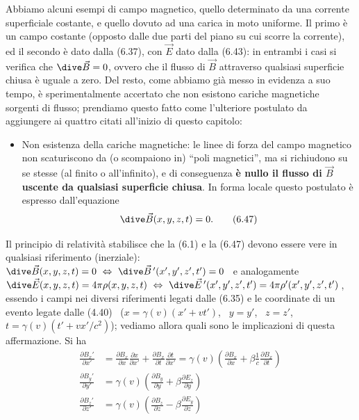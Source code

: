 Abbiamo alcuni esempi di campo magnetico, quello determinato da una corrente
superficiale costante, e quello dovuto ad una carica in moto uniforme. Il primo
\`e un campo costante (opposto dalle due parti del piano su cui scorre la
corrente), ed il secondo \`e dato dalla (6.37), con $\vec E$ dato dalla (6.43):
in entrambi i casi si verifica che $\dive\vec B=0$, ovvero che il flusso di
$\vec B$ attraverso qualsiasi superficie chiusa \`e uguale a zero. Del resto,
come abbiamo gi\`a messo in evidenza a suo tempo, \`e sperimentalmente accertato
che non esistono cariche magnetiche sorgenti di flusso; prendiamo questo fatto
come l'ulteriore postulato da aggiungere ai quattro citati all'inizio di questo
capitolo:
\begin{itemize}
  \item[$\mathbf p_5$] Non esistenza della cariche magnetiche: le linee di forza
    del campo magnetico non scaturiscono da (o scompaiono in) ``poli
    magnetici'', ma si richiudono su se stesse (al finito o all'infinito), e di
    conseguenza \textbf{\`e nullo il flusso di $\vec B$ uscente da qualsiasi
    superficie chiusa}. In forma locale questo postulato \`e espresso
    dall'equazione
    \begin{equation}
      \dive\vec B(x,y,z,t)=0.
      \tag{6.47}
    \end{equation}
\end{itemize}
Il principio di relativit\`a stabilisce che la (6.1) e la (6.47) devono essere
vere in qualsiasi riferimento (inerziale):
\ $\dive\vec B(x,y,z,t)=0\ \Leftrightarrow\ \dive\vec B\,'(x',y',z',t')=0$ \ e
analogamente \ $\dive\vec E(x,y,z,t)=4\pi\rho(x,y,z,t)
\ \Leftrightarrow\ \dive\vec E\,'(x',y',z',t')=4\pi\rho'(x',y',z',t')$\,,
essendo i campi nei diversi riferimenti legati dalle (6.35) e le coordinate di
un evento legate dalle (4.40) \ \big($x=\gamma(v)(x'+vt')$, \ $y=y'$,
\ $z=z'$, \ $t=\gamma(v)(t'+vx'/c^2)$\big); vediamo allora quali sono le
implicazioni di questa affermazione. Si ha
\begin{equation}
  \begin{aligned}
    \frac{\partial B_x'}{\partial x'}
    &=\frac{\partial B_x}{\partial x}\frac{\partial x}{\partial x'}
    +\frac{\partial B_x}{\partial t}\frac{\partial t}{\partial x'}
    =\gamma(v)\left(\frac{\partial B_x}{\partial x}
    +\beta\frac{1}{c}\frac{\partial B_x}{\partial t}\right)\\
    \frac{\partial B_y'}{\partial y'}
    &=\gamma(v)\left(\frac{\partial B_y}{\partial y}
    +\beta\frac{\partial E_z}{\partial y}\right)\\
    \frac{\partial B_z'}{\partial z'}
    &=\gamma(v)\left(\frac{\partial B_z}{\partial z}
    -\beta\frac{\partial E_y}{\partial z}\right)
  \end{aligned}
  \tag{6.48}
\end{equation}
